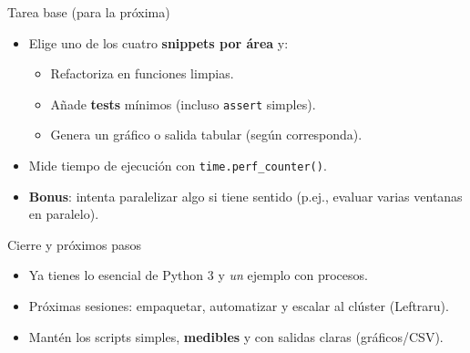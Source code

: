 \documentclass[aspectratio=169,professionalfonts]{beamer}
\begin{document}
\begin{frame}{Tarea base (para la próxima)}
\begin{itemize}
  \item Elige uno de los cuatro \textbf{snippets por área} y:
  \begin{itemize}
    \item Refactoriza en funciones limpias.
    \item Añade \textbf{tests} mínimos (incluso \texttt{assert} simples).
    \item Genera un gráfico o salida tabular (según corresponda).
  \end{itemize}
  \item Mide tiempo de ejecución con \texttt{time.perf\_counter()}.
  \item \textbf{Bonus}: intenta paralelizar algo si tiene sentido (p.ej., evaluar varias ventanas en paralelo).
\end{itemize}
\end{frame}

\begin{frame}{Cierre y próximos pasos}
\begin{itemize}
  \item Ya tienes lo esencial de Python 3 y \emph{un} ejemplo con procesos.
  \item Próximas sesiones: empaquetar, automatizar y escalar al clúster (Leftraru).
  \item Mantén los scripts simples, \textbf{medibles} y con salidas claras (gráficos/CSV).
\end{itemize}
\end{frame}
\end{document}
